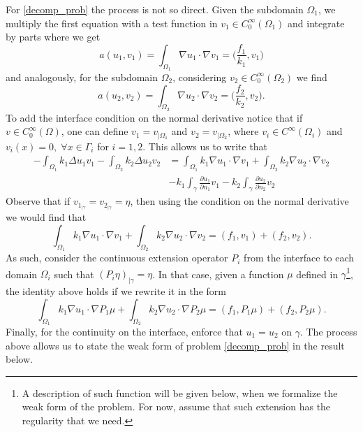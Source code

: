 For \eqref{decomp_prob} the process is not so direct. Given the subdomain \(\Omega_1\), we multiply the first equation with a test function in \(v_1 \in C^\infty_0(\Omega_1)\) and integrate by parts where we get 
\[
a(u_1,v_1) = \int_{\Omega_1} \nabla u_1 \cdot \nabla v_1 = \Big(\frac{f_1}{k_1}, v_1\Big)    
\]
and analogously, for the subdomain \(\Omega_2\), considering \(v_2 \in C^\infty_0(\Omega_2)\) we find
\[
a(u_2,v_2) = \int_{\Omega_2} \nabla u_2 \cdot \nabla v_2 = \Big(\frac{f_2}{k_2}, v_2\Big).        
\]
To add the interface condition on the normal derivative notice that if \(v \in C^\infty_0(\Omega)\), one can define \(v_1 = v_{|\Omega_1}\) and \(v_2 = v_{|\Omega_2}\), where \(v_i \in C^\infty(\Omega_i)\) and \(v_i(x)=0, \; \forall x \in \Gamma_i\) for \(i=1, 2\). This allows us to write that
\begin{align*}
    -\int_{\Omega_1} k_1 \Delta u_1 v_1 -\int_{\Omega_2} k_2 \Delta u_2 v_2 &= \int_{\Omega_1} k_1\nabla u_1 \cdot \nabla v_1 + \int_{\Omega_2} k_2\nabla u_2 \cdot \nabla v_2\\
    &- k_1 \int_\gamma \frac{\partial u_1}{\partial n_1}v_1 - k_2 \int_\gamma \frac{\partial u_2}{\partial n_2}v_2
\end{align*}
Observe that if \(v_{1_{|\gamma}} = v_{2_{|\gamma}} = \eta\), then using the condition on the normal derivative we would find that 
\[
\int_{\Omega_1} k_1\nabla u_1 \cdot \nabla v_1 + \int_{\Omega_2} k_2\nabla u_2 \cdot \nabla v_2 = (f_1, v_1) + (f_2, v_2).
\]
As such, consider the continuous extension operator \(P_i\) from the interface to each domain \(\Omega_i\) such that \((P_i \eta)_{|\gamma} = \eta\). In that case, given a function \(\mu\) defined in \(\gamma\)\footnote{A description of such function will be given below, when we formalize the weak form of the problem. For now, assume that such extension has the regularity that we need.}, the identity above holds if we rewrite it in the form
\[
\int_{\Omega_1} k_1\nabla u_1 \cdot \nabla P_1 \mu + \int_{\Omega_2} k_2\nabla u_2 \cdot \nabla P_2 \mu = (f_1, P_1 \mu) + (f_2, P_2 \mu).  
\]
Finally, for the continuity on the interface, enforce that \(u_1 = u_2\) on \(\gamma\). The process above allows us to state the weak form of problem \eqref{decomp_prob} in the result below.
